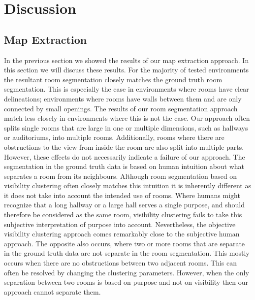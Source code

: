 \section{Discussion}

\subsection{Map Extraction}
\label{section:map_extraction}
In the previous section we showed the results of our map extraction approach. In this section we will discuss these results. For the majority of tested environments the resultant room segmentation closely matches the ground truth room segmentation. This is especially the case in environments where rooms have clear delineations; environments where rooms have walls between them and are only connected by small openings. The results of our room segmentation approach match less closely in environments where this is not the case. Our approach often splits single rooms that are large in one or multiple dimensions, such as hallways or auditoriums, into multiple rooms. Additionally, rooms where there are obstructions to the view from inside the room are also split into multiple parts. However, these effects do not necessarily indicate a failure of our approach. The segmentation in the ground truth data is based on human intuition about what separates a room from its neighbours. Although room segmentation based on visibility clustering often closely matches this intuition it is inherently different as it does not take into account the intended use of rooms. Where humans might recognize that a long hallway or a large hall serves a single purpose, and should therefore be considered as the same room, visibility clustering fails to take this subjective interpretation of purpose into account. Nevertheless, the objective visibility clustering approach comes remarkably close to the subjective human approach. The opposite also occurs, where two or more rooms that are separate in the ground truth data are not separate in the room segmentation. This mostly occurs when there are no obstructions between two adjacent rooms. This can often be resolved by changing the clustering parameters. However, when the only separation between two rooms is based on purpose and not on visibility then our approach cannot separate them.

